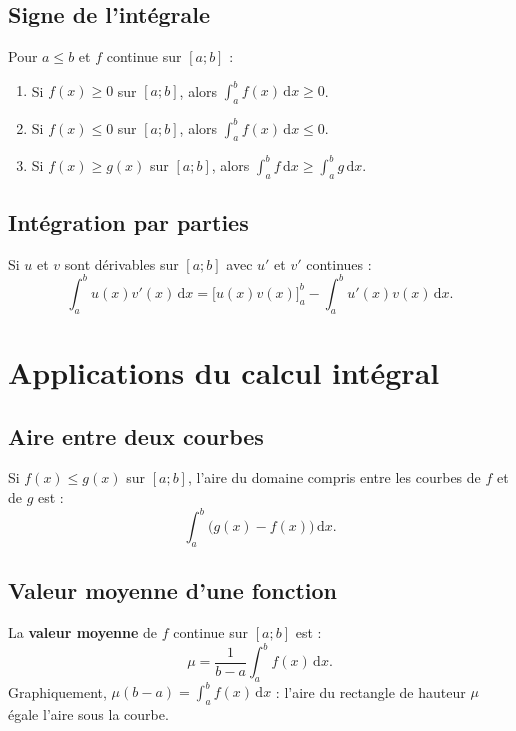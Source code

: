 \documentclass[11pt,a4paper,openany]{book}
\theoremstyle{definition}
\begin{document}
    \subsection{Signe de l'intégrale}
    \begin{Propriété}
        Pour $a\leq b$ et $f$ continue sur $[a;b]$ :
        \begin{enumerate}
            \item Si $f(x)\geq 0$ sur $[a;b]$, alors $\int_a^b f(x)\,\mathrm{d}x\geq 0$.
            \item Si $f(x)\leq 0$ sur $[a;b]$, alors $\int_a^b f(x)\,\mathrm{d}x\leq 0$.
            \item Si $f(x)\geq g(x)$ sur $[a;b]$, alors
                  $\int_a^b f\,\mathrm{d}x\geq\int_a^b g\,\mathrm{d}x$.
        \end{enumerate}
    \end{Propriété}

    \subsection{Intégration par parties}
    \begin{Théorème}
        Si $u$ et $v$ sont dérivables sur $[a;b]$ avec $u'$ et $v'$ continues :
        \[
            \int_a^b u(x)v'(x)\,\mathrm{d}x
            = \bigl[u(x)v(x)\bigr]_a^b - \int_a^b u'(x)v(x)\,\mathrm{d}x.
        \]
    \end{Théorème}

    \section{Applications du calcul intégral}
    \subsection{Aire entre deux courbes}
    \begin{Propriété}
        Si $f(x)\leq g(x)$ sur $[a;b]$, l'aire du domaine compris entre les courbes de $f$
        et de $g$ est :
        \[
            \int_a^b\bigl(g(x)-f(x)\bigr)\,\mathrm{d}x.
        \]
    \end{Propriété}

    \subsection{Valeur moyenne d'une fonction}
    \begin{Propriété}
        La \textbf{valeur moyenne} de $f$ continue sur $[a;b]$ est :
        \[
            \mu = \frac{1}{b-a}\int_a^b f(x)\,\mathrm{d}x.
        \]
        Graphiquement, $\mu(b-a)=\int_a^b f(x)\,\mathrm{d}x$ : l'aire du rectangle de
        hauteur $\mu$ égale l'aire sous la courbe.
    \end{Propriété}
\end{document}
